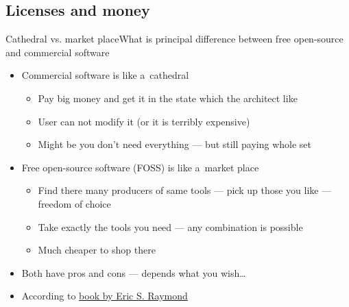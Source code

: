 \documentclass[compress, ucs, xelatex, 11pt, xcolor=svgnames, aspectratio=169,
	hyperref={
		bookmarks=true,
		unicode=true,
		colorlinks=true,
		pdftitle={Linux, command line and MetaCentrum},
		plainpages=false,
		pdfauthor={Vojtech Zeisek},
		pdfsubject={Course about use of Linux command line, writing shell scripts and using MetaCentrum of CESNET},
		pdfcreator={XeLaTeX},
		pdfkeywords={Linux, GNU, BASH, shell, command line, MetaCentrum},
		linkcolor=DarkRed, %
		anchorcolor=DarkBlue, %
		citecolor=Indigo, %
		filecolor=NavyBlue, %
		menucolor=DarkMagenta, %
		urlcolor=DarkBlue, %
		pdftex},
	url={hyphens, lowtilde} %
	]{beamer}
\begin{document}
\subsection{Licenses and money}

\begin{frame}{Cathedral vs. market place}{What is principal difference between free open-source and commercial software}
	\begin{itemize}
		\item Commercial software is like a~cathedral
		\begin{itemize}
			\item Pay big money and get it in the state which the architect like
			\item User can not modify it (or it is terribly expensive)
			\item Might be you don't need everything --- but still paying whole set
		\end{itemize}
		\item Free open-source software (FOSS) is like a~market place
		\begin{itemize}
			\item Find there many producers of same tools --- pick up those you like --- freedom of choice
			\item Take exactly the tools you need --- any combination is possible
			\item Much cheaper to shop there
		\end{itemize}
		\item Both have pros and cons --- depends what you wish\ldots
		\item According to \href{https://en.wikipedia.org/wiki/The_Cathedral_and_the_Bazaar}{book by Eric S. Raymond}
	\end{itemize}
\end{frame}
\end{document}
